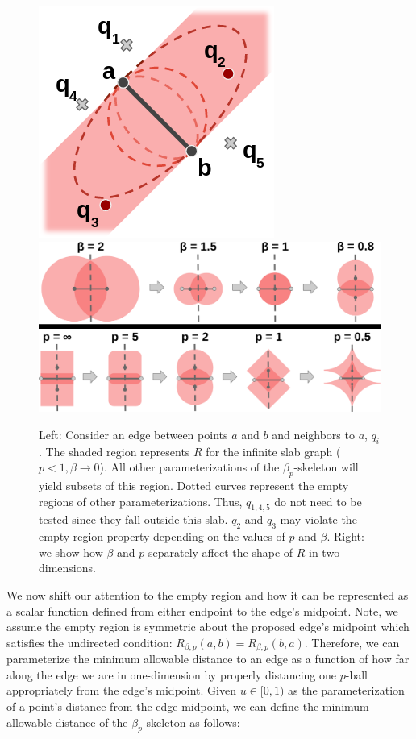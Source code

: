 \begin{figure}[htbp]
    \includegraphics[width=0.34\linewidth]{figs/chap7/infinite_slab.png}
    \includegraphics[width=0.64\linewidth]{figs/chap7/variable_parameters.png}
    \caption{Left: Consider an edge between points $a$ and $b$ and neighbors to $a$, $q_{i}$.
    The shaded region represents $R$ for the infinite slab graph ($p < 1, \beta \rightarrow 0$).
    All other parameterizations of the $\beta_p$-skeleton will yield subsets of this region.
    Dotted curves represent the empty regions of other parameterizations.
    Thus, $q_{1,4,5}$ do not need to be tested since they fall outside this slab.
    $q_2$ and $q_3$ may violate the empty region property depending on the values of $p$ and $\beta$.
    Right: we show how $\beta$ and $p$ separately affect the shape of $R$ in two dimensions.}
    \label{fig:infinite_slab}
\end{figure}

We now shift our attention to the empty region and how it can be represented as a scalar function defined from either endpoint to the edge's midpoint.
%
Note, we assume the empty region is symmetric about the proposed edge's midpoint which satisfies the undirected condition: $R_{\beta,p}(a,b)=R_{\beta,p}(b,a)$.
%
Therefore, we can parameterize the minimum allowable distance to an edge as a function of how far along the edge we are in one-dimension by properly distancing one $p$-ball appropriately from the edge's midpoint.
%
Given $u \in [0, 1)$ as the parameterization of a point's distance from the edge midpoint, we can define the minimum allowable distance of the $\beta_p$-skeleton as follows:

